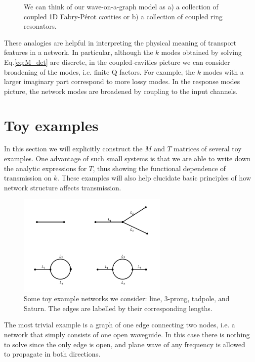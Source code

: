 \begin{figure}[h]
\begin{subfigure}[b]{0.3\textwidth}
        \caption{}
    \end{subfigure}
    
    \caption{We can think of our wave-on-a-graph model as a) a collection of coupled 1D Fabry-P\'erot cavities or b) a collection of coupled ring resonators.}\label{fig:coupled_FP_rings}
\end{figure}

These analogies are helpful in interpreting the physical meaning of transport features in a network. In particular, although the $k$ modes obtained by solving Eq.\ref{eq:M_det} are discrete, in the coupled-cavities picture we can consider broadening of the modes, i.e. finite Q factors. For example, the $k$ modes with a larger imaginary part correspond to more lossy modes. In the response modes picture, the network modes are broadened by coupling to the input channels.


\section{Toy examples}
\label{sec:toy_examples}

In this section we will explicitly construct the $M$ and $T$ matrices of several toy examples. One advantage of such small systems is that we are able to write down the analytic expressions for $T$, thus showing the functional dependence of transmission on $k$. These examples will also help elucidate basic principles of how network structure affects transmission.

\begin{figure}[h]
  \centering
    \includegraphics[width=0.65\textwidth]{ch2/fig2/toy_examples_labeled.jpg}
    \caption{Some toy example networks we consider: line, 3-prong, tadpole, and Saturn. The edges are labelled by their corresponding lengths.}
    \label{fig:toy_examples}
\end{figure}

The most trivial example is a graph of one edge connecting two nodes, i.e. a network that simply consists of one open waveguide. In this case there is nothing to solve since the only edge is open, and plane wave of any frequency is allowed to propagate in both directions.

